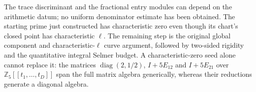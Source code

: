 The trace discriminant and the fractional entry modules can depend on
the arithmetic datum; no uniform denominator estimate has been obtained.
The starting prime just constructed has characteristic zero even though
its chart's closed point has characteristic $\ell$.
The remaining step is the original global component and
characteristic-$\ell$ curve argument, followed by two-sided rigidity
and the quantitative integral Selmer budget. A characteristic-zero
seed alone cannot replace it: the matrices
$\operatorname{diag}(2,1/2)$, $I+5E_{12}$ and $I+5E_{21}$ over
$\mathbb Z_5[[t_1,\ldots,t_D]]$ span the full matrix algebra generically,
whereas their reductions generate a diagonal algebra.
